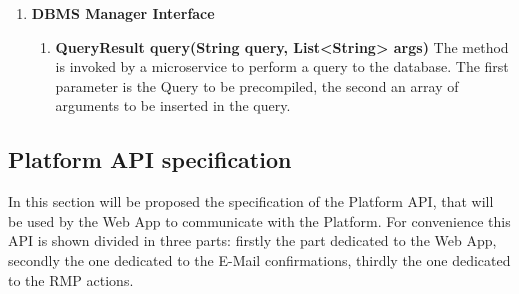 \begin{enumerate}
\begin{enumerate}[label=$\bullet$]
        \end{enumerate}
    \item \textbf{DBMS Manager Interface}
        \begin{enumerate} [label=$\bullet$]
            \item \textbf{QueryResult query(String query, List<String> args)} The method is invoked by a microservice to perform a query to the database. The first parameter is the Query to be precompiled, the second an array of arguments to be inserted in the query.
    \end{enumerate}
\end{enumerate}
\subsection{Platform API specification}
In this section will be proposed the specification of the Platform API, that will be used by the Web App to communicate with the Platform.
For convenience this API is shown divided in three parts: firstly the part dedicated to the Web App, secondly the one dedicated to the E-Mail confirmations, thirdly the one dedicated to the RMP actions.
